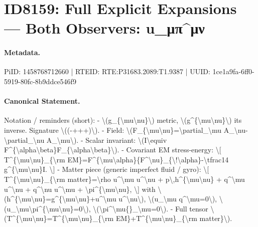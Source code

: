 \section*{ID8159: Full Explicit Expansions — Both Observers: u\_μπ\textasciicircum{}μν}
\paragraph{Metadata.}
PiID: 1458768712660 | RTEID: RTE:P31683.2089:T1.9387 | UUID: 1ce1a9fa-6ff0-5919-80fc-8b9ddce546f9

\paragraph{Canonical Statement.}
Notation / reminders (short): - \textbackslash{}(g\_\{\textbackslash{}mu\textbackslash{}nu\}\textbackslash{}) metric, \textbackslash{}(g\textasciicircum{}\{\textbackslash{}mu\textbackslash{}nu\}\textbackslash{}) its inverse. Signature \textbackslash{}((-+++)\textbackslash{}). - Field: \textbackslash{}(F\_\{\textbackslash{}mu\textbackslash{}nu\}=\textbackslash{}partial\_\textbackslash{}mu A\_\textbackslash{}nu-\textbackslash{}partial\_\textbackslash{}nu A\_\textbackslash{}mu\textbackslash{}). - Scalar invariant: \textbackslash{}(I\textbackslash{}equiv F\textasciicircum{}\{\textbackslash{}alpha\textbackslash{}beta\}F\_\{\textbackslash{}alpha\textbackslash{}beta\}\textbackslash{}). - Covariant EM stress-energy: \textbackslash{}[ T\textasciicircum{}\{\textbackslash{}mu\textbackslash{}nu\}\_\{\textbackslash{}rm EM\}=F\textasciicircum{}\{\textbackslash{}mu\textbackslash{}alpha\}\{F\textasciicircum{}\textbackslash{}nu\}\_\{\textbackslash{}!\textbackslash{}alpha\}-\textbackslash{}tfrac14 g\textasciicircum{}\{\textbackslash{}mu\textbackslash{}nu\}I. \textbackslash{}] - Matter piece (generic imperfect fluid / gyro): \textbackslash{}[ T\textasciicircum{}\{\textbackslash{}mu\textbackslash{}nu\}\_\{\textbackslash{}rm matter\}=\textbackslash{}rho u\textasciicircum{}\textbackslash{}mu u\textasciicircum{}\textbackslash{}nu + p\textbackslash{},h\textasciicircum{}\{\textbackslash{}mu\textbackslash{}nu\} + q\textasciicircum{}\textbackslash{}mu u\textasciicircum{}\textbackslash{}nu + q\textasciicircum{}\textbackslash{}nu u\textasciicircum{}\textbackslash{}mu + \textbackslash{}pi\textasciicircum{}\{\textbackslash{}mu\textbackslash{}nu\}, \textbackslash{}] with \textbackslash{}(h\textasciicircum{}\{\textbackslash{}mu\textbackslash{}nu\}=g\textasciicircum{}\{\textbackslash{}mu\textbackslash{}nu\}+u\textasciicircum{}\textbackslash{}mu u\textasciicircum{}\textbackslash{}nu\textbackslash{}), \textbackslash{}(u\_\textbackslash{}mu q\textasciicircum{}\textbackslash{}mu=0\textbackslash{}), \textbackslash{}(u\_\textbackslash{}mu\textbackslash{}pi\textasciicircum{}\{\textbackslash{}mu\textbackslash{}nu\}=0\textbackslash{}), \textbackslash{}(\textbackslash{}pi\textasciicircum{}\textbackslash{}mu\{\}\_\textbackslash{}mu=0\textbackslash{}). - Full tensor \textbackslash{}(T\textasciicircum{}\{\textbackslash{}mu\textbackslash{}nu\}=T\textasciicircum{}\{\textbackslash{}mu\textbackslash{}nu\}\_\{\textbackslash{}rm EM\}+T\textasciicircum{}\{\textbackslash{}mu\textbackslash{}nu\}\_\{\textbackslash{}rm matter\}\textbackslash{}).

